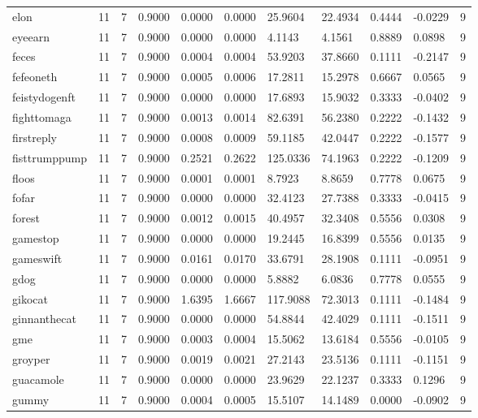\begin{table}[htbp]
\begin{tabular}{lllllllllll}
elon & 11 & 7 & 0.9000 & 0.0000 & 0.0000 & 25.9604 & 22.4934 & 0.4444 & -0.0229 & 9 \\
eyeearn & 11 & 7 & 0.9000 & 0.0000 & 0.0000 & 4.1143 & 4.1561 & 0.8889 & 0.0898 & 9 \\
feces & 11 & 7 & 0.9000 & 0.0004 & 0.0004 & 53.9203 & 37.8660 & 0.1111 & -0.2147 & 9 \\
fefeoneth & 11 & 7 & 0.9000 & 0.0005 & 0.0006 & 17.2811 & 15.2978 & 0.6667 & 0.0565 & 9 \\
feistydogenft & 11 & 7 & 0.9000 & 0.0000 & 0.0000 & 17.6893 & 15.9032 & 0.3333 & -0.0402 & 9 \\
fighttomaga & 11 & 7 & 0.9000 & 0.0013 & 0.0014 & 82.6391 & 56.2380 & 0.2222 & -0.1432 & 9 \\
firstreply & 11 & 7 & 0.9000 & 0.0008 & 0.0009 & 59.1185 & 42.0447 & 0.2222 & -0.1577 & 9 \\
fisttrumppump & 11 & 7 & 0.9000 & 0.2521 & 0.2622 & 125.0336 & 74.1963 & 0.2222 & -0.1209 & 9 \\
floos & 11 & 7 & 0.9000 & 0.0001 & 0.0001 & 8.7923 & 8.8659 & 0.7778 & 0.0675 & 9 \\
fofar & 11 & 7 & 0.9000 & 0.0000 & 0.0000 & 32.4123 & 27.7388 & 0.3333 & -0.0415 & 9 \\
forest & 11 & 7 & 0.9000 & 0.0012 & 0.0015 & 40.4957 & 32.3408 & 0.5556 & 0.0308 & 9 \\
gamestop & 11 & 7 & 0.9000 & 0.0000 & 0.0000 & 19.2445 & 16.8399 & 0.5556 & 0.0135 & 9 \\
gameswift & 11 & 7 & 0.9000 & 0.0161 & 0.0170 & 33.6791 & 28.1908 & 0.1111 & -0.0951 & 9 \\
gdog & 11 & 7 & 0.9000 & 0.0000 & 0.0000 & 5.8882 & 6.0836 & 0.7778 & 0.0555 & 9 \\
gikocat & 11 & 7 & 0.9000 & 1.6395 & 1.6667 & 117.9088 & 72.3013 & 0.1111 & -0.1484 & 9 \\
ginnanthecat & 11 & 7 & 0.9000 & 0.0000 & 0.0000 & 54.8844 & 42.4029 & 0.1111 & -0.1511 & 9 \\
gme & 11 & 7 & 0.9000 & 0.0003 & 0.0004 & 15.5062 & 13.6184 & 0.5556 & -0.0105 & 9 \\
groyper & 11 & 7 & 0.9000 & 0.0019 & 0.0021 & 27.2143 & 23.5136 & 0.1111 & -0.1151 & 9 \\
guacamole & 11 & 7 & 0.9000 & 0.0000 & 0.0000 & 23.9629 & 22.1237 & 0.3333 & 0.1296 & 9 \\
gummy & 11 & 7 & 0.9000 & 0.0004 & 0.0005 & 15.5107 & 14.1489 & 0.0000 & -0.0902 & 9 \\

\end{tabular}
\end{table}
